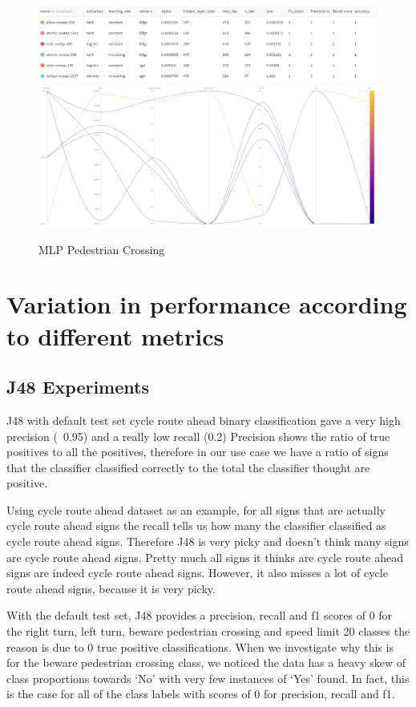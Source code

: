 \documentclass[11pt]{article}
\begin{document}
\begin{figure}[H]
  \centering 
  \includegraphics[width = \textwidth, height = 0.25\textwidth, keepaspectratio]{Images/MLPPedCrossingTable.png} 
  \includegraphics[width = \textwidth, height = 0.4\textwidth, keepaspectratio]{Images/MLPedCrossingGraph.png} 
  \caption {MLP Pedestrian Crossing} \label{MLPPedCrossing}
\end{figure}


\newpage
\section{Variation in performance according to different metrics}
\subsection{J48 Experiments}

J48 with default test set cycle route ahead binary classification gave a very high precision (~0.95) and a really low recall (0.2) 
Precision shows the ratio of true positives to all the positives, therefore in our use case we have a ratio of signs that the classifier classified correctly to the total the classifier thought are positive. 
\par
Using cycle route ahead dataset as an example, for all signs that are actually cycle route ahead signs the recall tells us how many the classifier classified as cycle route ahead  signs. 
Therefore J48 is very picky and doesn't think many signs are cycle route ahead signs. Pretty much all signs it thinks are cycle route ahead signs are indeed cycle route ahead signs. However, it also misses a lot of cycle route ahead signs, because it is very picky.
\par
With the default test set, J48 provides a precision, recall and f1 scores of 0 for the right turn, left turn, beware pedestrian crossing and speed limit 20 classes the reason is due to 0 true positive classifications. When we investigate why this is for the beware pedestrian crossing class, we noticed the data has a heavy skew of class proportions towards ‘No’ with very few instances of ‘Yes’ found. In fact, this is the case for all of the class labels with scores of 0 for precision, recall and f1.
\end{document}
